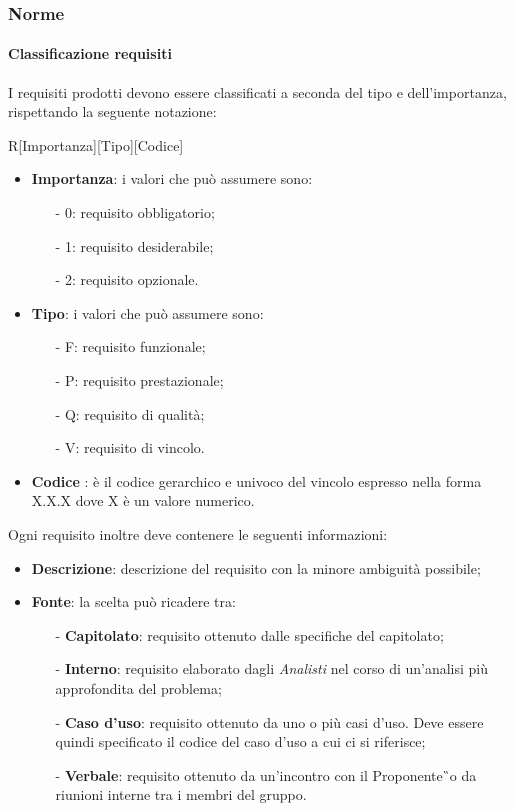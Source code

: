 \subsubsection{Norme}
\paragraph{Classificazione requisiti}
I requisiti prodotti devono essere classificati a seconda del tipo e dell'importanza, rispettando la seguente notazione:
\begin{center}
	R[Importanza][Tipo][Codice]
\end{center}

\begin{itemize}
	\item\textbf{Importanza}: i valori che può assumere sono:
	
	\begin{itemize}
		\item[-] 0: requisito obbligatorio;
		\item[-] 1: requisito desiderabile;
		\item[-] 2: requisito opzionale.
	\end{itemize}
	
	\item\textbf{Tipo}: i valori che può assumere sono:
		\begin{itemize}
			\item[-] F: requisito funzionale;
			\item[-] P: requisito prestazionale;
			\item[-] Q: requisito di qualità;
			\item[-] V: requisito di vincolo.
		\end{itemize}
	
	\item\textbf{Codice} : è il codice gerarchico e univoco del vincolo espresso nella forma X.X.X dove X è un valore numerico.
\end{itemize}
Ogni requisito inoltre deve contenere le seguenti informazioni:
	
\begin{itemize}
	\item\textbf{Descrizione}: descrizione del requisito con la minore ambiguità possibile;
	\item\textbf{Fonte}: la scelta può ricadere tra:
	\begin{itemize}
		\item[-] \textbf{Capitolato}: requisito ottenuto dalle specifiche del capitolato;
		\item[-] \textbf{Interno}: requisito elaborato dagli \textit{Analisti} nel corso di un'analisi più approfondita del problema;
		\item[-] \textbf{Caso d'uso}: requisito ottenuto da uno o più casi d'uso. Deve essere quindi specificato il codice del caso d'uso a cui ci si riferisce;
		\item[-] \textbf{Verbale}: requisito ottenuto da un'incontro con il Proponente\G\ o da riunioni interne tra i membri del gruppo.	
	\end{itemize}
\end{itemize}

